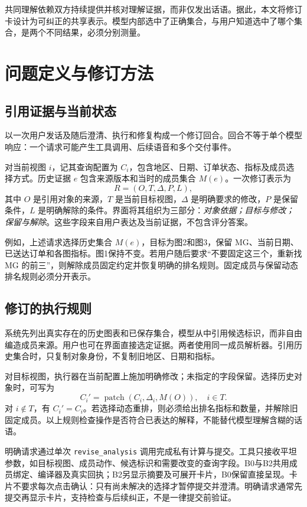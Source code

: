 \documentclass[conference]{IEEEtran}
\begin{document}
共同理解依赖双方持续提供并核对理解证据，而非仅发出话语\cite{grounding}。据此，本文将修订卡设计为可纠正的共享表示。模型内部选中了正确集合，与用户知道选中了哪个集合，是两个不同结果，必须分别测量。

\section{问题定义与修订方法}
\subsection{引用证据与当前状态}
以一次用户发话及随后澄清、执行和修复构成一个修订回合。回合不等于单个模型响应：一个请求可能产生工具调用、后续语音和多个交付事件。

对当前视图 $i$，记其查询配置为 $C_i$，包含地区、日期、订单状态、指标及成员选择方式。历史证据 $e$ 包含来源版本和当时的成员集合 $M(e)$。一次修订表示为
\begin{equation}
R=(O,T,\Delta,P,L),
\end{equation}
其中 $O$ 是引用对象的来源，$T$ 是当前目标视图，$\Delta$ 是明确要求的修改，$P$ 是保留条件，$L$ 是明确解除的条件。界面将其组织为三部分：\emph{对象依据；目标与修改；保留与解除}。这些字段来自用户表达及当前证据，不包含评分答案。

例如，上述请求选择历史集合 $M(e)$，目标为图2和图3，保留 MG、当前日期、已送达订单和各图指标。图1保持不变。若用户随后要求“不要固定这三个，重新找 MG 的前三”，则解除成员固定约定并恢复明确的排名规则。固定成员与保留动态排名规则必须分开表示。

\subsection{修订的执行规则}
系统先列出真实存在的历史图表和已保存集合，模型从中引用候选标识，而非自由编造成员来源。用户也可在界面直接选定证据。两者使用同一成员解析器。引用历史集合时，只复制对象身份，不复制旧地区、日期和指标。

对目标视图，执行器在当前配置上施加明确修改；未指定的字段保留。选择历史对象时，可写为
\begin{equation}
C_i'=\operatorname{patch}(C_i,\Delta_i,M(O)),\quad i\in T.
\end{equation}
对 $i\notin T$，有 $C_i'=C_i$。若选择动态重排，则必须给出排名指标和数量，并解除旧固定成员。以上规则检查操作是否符合已表达的解释，不能替代模型理解含糊的话语。

明确请求通过单次 \texttt{revise\_analysis} 调用完成私有计算与提交。工具只接收平坦参数，如目标视图、成员动作、候选标识和需要改变的查询字段。B0与B2共用成员绑定、编译器及真实回执；B2另显示摘要及可展开卡片，B0保留直接呈现。卡片不要求每次点击确认：只有尚未解决的选择才暂停提交并澄清。明确请求通常先提交再显示卡片，支持检查与后续纠正，不是一律提交前验证。
\end{document}
